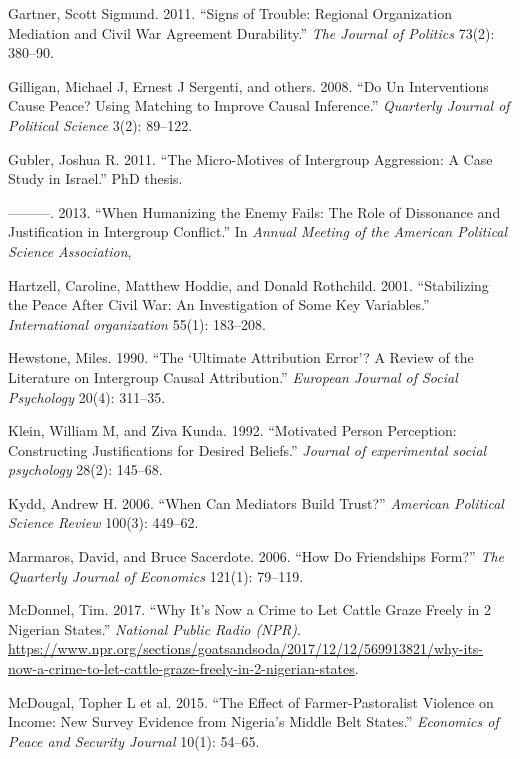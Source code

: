 \documentclass[11pt]{article}
\begin{document}
\hypertarget{ref-gartner2011signs}{}
Gartner, Scott Sigmund. 2011. ``Signs of Trouble: Regional Organization
Mediation and Civil War Agreement Durability.'' \emph{The Journal of
Politics} 73(2): 380--90.

\hypertarget{ref-gilligan2008interventions}{}
Gilligan, Michael J, Ernest J Sergenti, and others. 2008. ``Do Un
Interventions Cause Peace? Using Matching to Improve Causal Inference.''
\emph{Quarterly Journal of Political Science} 3(2): 89--122.

\hypertarget{ref-gubler2011diss}{}
Gubler, Joshua R. 2011. ``The Micro-Motives of Intergroup Aggression: A
Case Study in Israel.'' PhD thesis.

\hypertarget{ref-gubler2013humanizing}{}
---------. 2013. ``When Humanizing the Enemy Fails: The Role of
Dissonance and Justification in Intergroup Conflict.'' In \emph{Annual
Meeting of the American Political Science Association},

\hypertarget{ref-hartzell2001stabilizing}{}
Hartzell, Caroline, Matthew Hoddie, and Donald Rothchild. 2001.
``Stabilizing the Peace After Civil War: An Investigation of Some Key
Variables.'' \emph{International organization} 55(1): 183--208.

\hypertarget{ref-hewstone1990ultimate}{}
Hewstone, Miles. 1990. ``The `Ultimate Attribution Error'? A Review of
the Literature on Intergroup Causal Attribution.'' \emph{European
Journal of Social Psychology} 20(4): 311--35.

\hypertarget{ref-klein1992motivated}{}
Klein, William M, and Ziva Kunda. 1992. ``Motivated Person Perception:
Constructing Justifications for Desired Beliefs.'' \emph{Journal of
experimental social psychology} 28(2): 145--68.

\hypertarget{ref-kydd2006can}{}
Kydd, Andrew H. 2006. ``When Can Mediators Build Trust?'' \emph{American
Political Science Review} 100(3): 449--62.

\hypertarget{ref-marmaros2006friendships}{}
Marmaros, David, and Bruce Sacerdote. 2006. ``How Do Friendships Form?''
\emph{The Quarterly Journal of Economics} 121(1): 79--119.

\hypertarget{ref-mcdonnel2017graze}{}
McDonnel, Tim. 2017. ``Why It's Now a Crime to Let Cattle Graze Freely
in 2 Nigerian States.'' \emph{National Public Radio (NPR)}.
\url{https://www.npr.org/sections/goatsandsoda/2017/12/12/569913821/why-its-now-a-crime-to-let-cattle-graze-freely-in-2-nigerian-states}.

\hypertarget{ref-mcdougal2015effect}{}
McDougal, Topher L et al. 2015. ``The Effect of Farmer-Pastoralist
Violence on Income: New Survey Evidence from Nigeria's Middle Belt
States.'' \emph{Economics of Peace and Security Journal} 10(1): 54--65.
\end{document}
